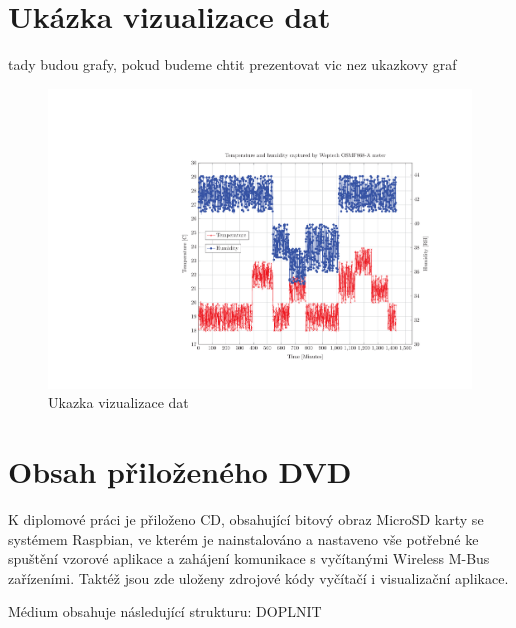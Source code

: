 \chapter{Ukázka vizualizace dat}
\label{PrilohaGrafy}
	\colorbox[rgb]{1,0,0}{tady budou grafy, pokud budeme chtit prezentovat vic nez ukazkovy graf}
	 \begin{figure}[!ht]
  \begin{center}
    \includegraphics[scale=0.8]{obrazky/chart_weptech}
  \end{center}
  \caption{Ukazka vizualizace dat}
	\label{GrafPriloha1}
\end{figure}

\chapter{Obsah přiloženého DVD}
\label{PrilohaMedium}
K diplomové práci je přiloženo CD, obsahující bitový obraz MicroSD karty se systémem Raspbian, ve kterém je nainstalováno a nastaveno vše potřebné ke spuštění vzorové aplikace a zahájení komunikace s vyčítanými Wireless M-Bus zařízeními. Taktéž jsou zde uloženy zdrojové kódy vyčítačí i visualizační aplikace.

Médium obsahuje následující strukturu: \colorbox[rgb]{1,0,0}{DOPLNIT}


